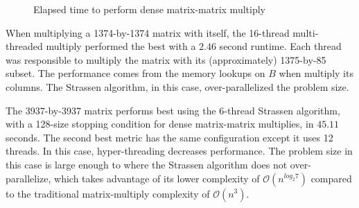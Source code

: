 \documentclass{article}
\begin{document}
\begin{figure}[h]      
	\centering 
    \hspace{10px}
    \hspace{10px}
    \caption{Elapsed time to perform dense matrix-matrix multiply}
    \label{materialflowChart}
\end{figure}

When multiplying a 1374-by-1374 matrix with itself, the 16-thread multi-threaded multiply performed the best with a $2.46$ second runtime. Each thread was responsible to multiply the matrix with its (approximately) 1375-by-85 subset.  The performance comes from the memory lookups on $B$ when multiply its columns. The Strassen algorithm, in this case, over-parallelized the problem size.
\linebreak

The 3937-by-3937 matrix performs best using the 6-thread Strassen algorithm, with a 128-size stopping condition for dense matrix-matrix multiplies, in $45.11$ seconds. The second best metric has the same configuration except it uses 12 threads. In this case, hyper-threading decreases performance. The problem size in this case is large enough to where the Strassen algorithm does not over-parallelize, which takes advantage of its lower complexity of $\mathcal{O}(n^{log_{2}{7}})$ compared to the traditional matrix-multiply complexity of $\mathcal{O}(n^3)$.
\end{document}

